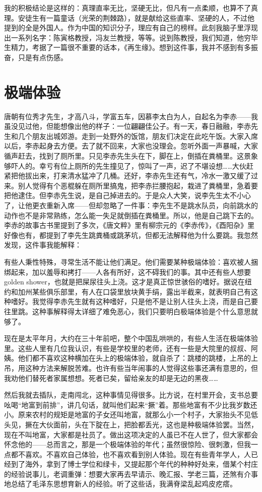 我的积极结论是这样的：真理直率无比，坚硬无比，但凡有一点柔顺，也算不了真理。安徒生有一篇童话（光荣的荆棘路），就是献给这些直率、坚硬的人，不过他提到的全是外国人。作为中国的知识分子，理应有自己的榜样。此刻我脑子里浮现出一系列名字：陈寅格教授，冯友兰教授，等等。说到陈教授，我们知道，他穷毕生精力，考据了一篇很不重要的话本，《再生缘》。想到这件事，我并不感到有多振奋，只是有点伤感。

\chapter{极端体验}

唐朝有位秀才先生，才高八斗，学富五车，因慕李太白为人，自起名为李赤——我虽没见过他，但能想像出他的样子：一位翩翩佳公子。有一天，春日融融，李赤先生和几个朋友出城郊游。走到一处野外的饭馆，朋友们决定在此吃午饭。大家入席以后，李赤起身去方便。去了就不回来，大家也没理会。忽听外面一声暴喊，大家循声赶去，找到了厕所里。只见李赤先生头在下，脚在上，倒插在粪桶里。这景象够吓人的。幸亏有位上厕所的先生撞见了，惊叫了一声，迟了不堪设想……大伙赶紧把他拔出来，打来清水猛冲了几桶。还好，李赤先生还有气，冷水一激又缓了过来。别人觉得有个恶棍躲在厕所里搞鬼，把李赤拦腰抱起，栽进了粪桶里，急着要把他逮住。但李赤先生说，是自己掉进去的。于是众人大笑，说李先生太不小心了，让他更衣重新入席——但却忽略了一件事：李先生不是跳水队员，向前跳水的动作也不是非常熟练，怎么能一失足就倒插在粪桶里。所以，他是自己跳下去的。李赤的故事古书里提到了多次，《唐文粹》里有柳宗元的《李赤传》，《酉阳杂》里好像也有，都提到了李先生跳粪桶或跳茅坑，但都无法解释他为什么要跳。我忽然发现，这件事我能解释： 

有些人秉性特殊，寻常生活不能让他们满足。他们需要某种极端体验：喜欢被人捆绑起来，加以羞辱和拷打——人各有所好，这不碍我们的事。其中还有些人想要golden shower，也就是把屎尿往头上浇。这才是真正惊世骇俗的嗜好。据说在纽约和加州某些俱乐部里，有人在口袋里放块黄手绢，露出半截来，就表明自己有这种嗜好。我觉得李赤先生就有这种嗜好，只是他不是让别人往头上浇，而是自己要往里跳。这种事解释得太详细了难免恶心，我们只要明白极端体验是个什么意思就够了。 

现在是太平年月，大约在三十年前吧，整个中国乱哄哄的，有些人生活在极端体验里。这些人里有几位我认识，有些是学校里的老师，还有一些是大院里的叔叔、阿姨。他们都不喜欢这种横加在头上的极端体验，就自杀了：跳楼的跳楼，上吊的上吊，用这种方法来解脱苦难。也许有些当年闹事的人觉得这些事还满有意思的，但我劝他们替死者家属想想。死者已矣，留给亲友的却是无边的黑夜…… 

然后我就去插队，走南闯北，这种事情见得很多。比方说，在村里开会，支书总要吆喝“地富到前排”，讲几句话，就叫他们起来“撅”着。那些地富有不少比我岁数还小。原来农村的规矩是地富的子女还叫地富，就那么小一个村子，大家抬头不见低头见，撅在大伙面前，头在下腚在上，把脸都丢光，这也是种极端体验罢。当然，现在不叫地富，大家都是社员了。做出这项决定的人虽已不在人世了，但大家都会怀念他的——总而言之，那是一个极端体验的年代；虽然很惊险、很刺激，但我一点都不喜欢。不喜欢自己体验，也不喜欢看到别人体验。现在有些青年学人，人已经到了海外，拿到了博士学位和绿卡，又提起那个年代的种种好处来，借某个村庄的经验说事儿，老调重弹：想要大家再去早请示、晚汇报、学老三篇，还煞有介事地总结了毛泽东思想育新人的经验。听了这些话，我满脊梁乱起鸡皮疙瘩。 

